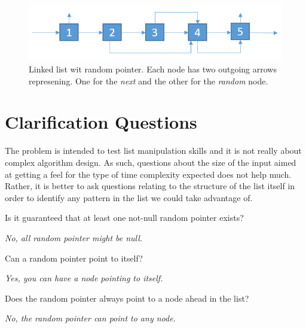 \begin{figure}
	\label{fig:clone_list_random_pointer:list1}
	\centering
	\includegraphics[scale=0.6]{sources/clone_list_random_pointer/images/random_list_1}
	\caption{Linked list wit random pointer. Each node has two outgoing arrows represening. One for the \textit{next} and the other for the \textit{random} node.}
\end{figure}


\section{Clarification Questions}
The problem is intended to test list manipulation skills and it is not really about complex algorithm design.
As such,  questions about the size of the input aimed at getting a feel for the type of time complexity expected does not help much.
Rather, it is better to ask questions relating to the structure of the list itself in order to identify any pattern in the list we could take advantage of.

\begin{QandA}
	\begin{questionitem} \begin{question} Is it guaranteed that at least one not-null random pointer exists?  \end{question} 	 
    \begin{answered}
		\textit{No, all random pointer might be null.}
	\end{answered} \end{questionitem}
	\begin{questionitem} \begin{question} Can a random pointer point to itself?  \end{question} 	 
    \begin{answered}
		\textit{Yes, you can have a node pointing to itself.}
	\end{answered} \end{questionitem}

	\begin{questionitem} \begin{question} Does the random pointer always point to a node ahead in the list?  \end{question} 	 
		\begin{answered}
			\textit{No, the random pointer can point to any node.}
		\end{answered} \end{questionitem}
	
\end{QandA}

